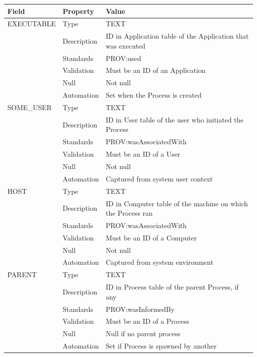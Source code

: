 \begin{longtable}[]{@{}
  >{\raggedright\arraybackslash}p{}
  >{\raggedright\arraybackslash}p{}
  >{\raggedright\arraybackslash}p{}@{}}
\toprule\noalign{}
\begin{minipage}[b]{\linewidth}\raggedright
Field
\end{minipage} & \begin{minipage}[b]{\linewidth}\raggedright
Property
\end{minipage} & \begin{minipage}[b]{\linewidth}\raggedright
Value
\end{minipage} \\
\midrule\noalign{}
\endhead
\bottomrule\noalign{}
\endlastfoot
EXECUTABLE & Type & TEXT \\
& Description & ID in Application table of the Application that was
executed \\
& Standards & PROV:used \\
& Validation & Must be an ID of an Application \\
& Null & Not null \\
& Automation & Set when the Process is created \\
SOME\_USER & Type & TEXT \\
& Description & ID in User table of the user who initiated the
Process \\
& Standards & PROV:wasAssociatedWith \\
& Validation & Must be an ID of a User \\
& Null & Not null \\
& Automation & Captured from system user context \\
HOST & Type & TEXT \\
& Description & ID in Computer table of the machine on which the Process
ran \\
& Standards & PROV:wasAssociatedWith \\
& Validation & Must be an ID of a Computer \\
& Null & Not null \\
& Automation & Captured from system environment \\
PARENT & Type & TEXT \\
& Description & ID in Process table of the parent Process, if any \\
& Standards & PROV:wasInformedBy \\
& Validation & Must be an ID of a Process \\
& Null & Null if no parent process \\
& Automation & Set if Process is spawned by another \\
\end{longtable}

